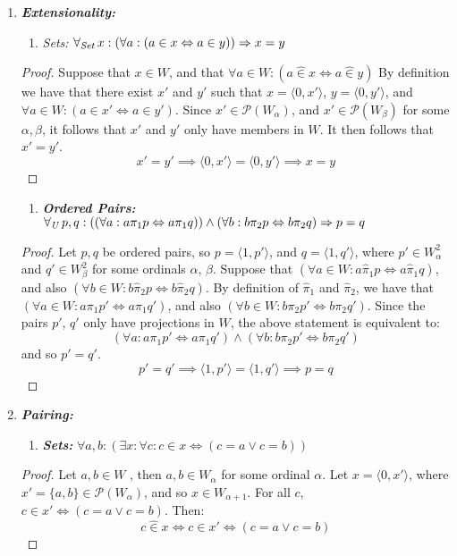 \documentclass[11pt]{report}
\newcommand{\all}[1]{\forall_{\mathit{#1}}\hspace{0.5mm}}
\newcommand{\pleft}{\mathrel{\pi_1}}
\newcommand{\pright}{\mathrel{\pi_2}}
\newcommand{\pair}[2]{\langle #1,#2 \rangle}
\newcommand{\zin}{\mathrel{\widehat{\in}}}
\newcommand{\zpright}{\mathrel{\widehat{\pi}_2}}
\newcommand{\zpleft}{\mathrel{\widehat{\pi}_1}}
\theoremstyle{definition}
\theoremstyle{theorem}
\theoremstyle{lemma}
\begin{document}
\begin{enumerate}[resume=axiomlist, label=\Roman*.]
  \item \textit{\textbf{Extensionality:}}
  \begin{enumerate}[series=sublist, label=(\roman*)]
    \item \textit{Sets:} $\all{Set} x: (\forall a: (a\in x \Leftrightarrow a\in y)) \Rightarrow x=y$
  \end{enumerate}
  \begin{proof}
    Suppose that $x\in W$, and that $\forall a\in W: (a \zin x \Leftrightarrow a\zin y)$
    By definition we have that there exist $x'$ and $y'$ such that $x=\pair{0}{x'}$, $y = \pair{0}{y'}$, and $\forall a\in W: (a\in x' \Leftrightarrow a\in y')$. 
    Since $x'\in\mathcal{P}(W_\alpha)$, and $x'\in\mathcal{P}(W_\beta)$ for some $\alpha, \beta$, it follows that $x'$ and $y'$ only have members in $W$. 
    It then follows that $x'=y'$.
    $$x'=y'\implies \pair{0}{x'} = \pair{0}{y'} \implies x = y$$
  \end{proof}
  \begin{enumerate}[resume=sublist, label=(\roman*)]
    \item \textit{\textbf{Ordered Pairs:}}
    $\all{U}p,q: ((\forall a: a\pi_1 p \Leftrightarrow a\pi_1 q))\wedge(\forall b: b\pi_2 p \Leftrightarrow b\pi_2 q)\Rightarrow p=q$
  \end{enumerate}
  \begin{proof}
  Let $p,q$ be ordered pairs, so $p = \pair{1}{p'}$, and $q= \pair{1}{q'}$, where $p'\in W_\alpha^2$ and $q'\in W_\beta^2$ for some ordinals $\alpha$, $\beta$.
  Suppose that $(\forall a\in W: a\zpleft p \Leftrightarrow a\zpleft q)$, and also $(\forall b\in W: b\zpright p \Leftrightarrow b\zpright q)$.
  By definition of $\zpleft$ and $\zpright$, we have that $(\forall a\in W: a\pleft p' \Leftrightarrow a\pleft q')$, and also $(\forall b\in W: b\pright p' \Leftrightarrow b\pright q')$.
  Since the pairs $p'$, $q'$ only have projections in $W$, the above statement is equivalent to: $$(\forall a: a\pleft p' \Leftrightarrow a\pleft q')\wedge(\forall b: b\pright p' \Leftrightarrow b\pright q')$$
  and so $p'=q'$.
  $$p'=q' \implies \pair{1}{p'} = \pair{1}{q'} \implies p = q$$
  \end{proof}
  \item \textit{\textbf{Pairing:}}
  \begin{enumerate}[series=sublist, label=(\roman*)]
    \item \textit{\textbf{Sets:}}
    $\forall a,b: (\exists x: \forall c: c\in x \Leftrightarrow (c=a \vee c=b))$
  \end{enumerate}
  \begin{proof}
    Let $a,b\in W$ , then $a,b\in W_\alpha$ for some ordinal $\alpha$.
    Let $x = \pair{0}{x'}$, where $x'=\{a,b\} \in \mathcal{P}(W_\alpha)$, and so $x\in W_{\alpha+1}$.
    For all $c$, $c\in x' \Leftrightarrow (c=a \vee c=b)$.
    Then:
      $$c\zin x \iff c\in x' \iff (c = a \vee c = b)$$
  \end{proof}


\end{enumerate}
\end{document}
